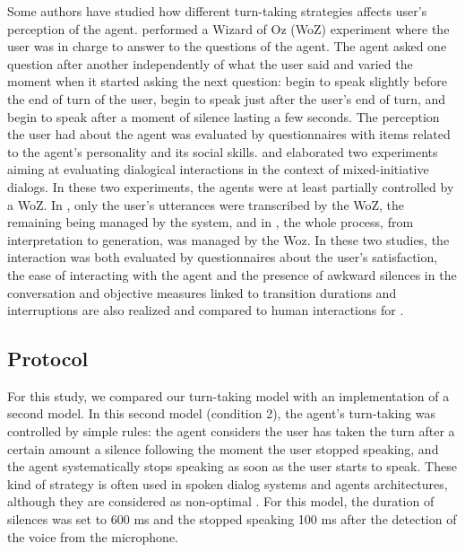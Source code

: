 Some authors have studied how different turn-taking strategies affects user's perception of the agent. 
\cite{ter_maat_how_2010} performed a Wizard of Oz (WoZ) experiment where the user was in charge to answer to the questions of the agent. The agent asked one question after another independently of what the user said and varied the moment when it started asking the next question: begin to speak slightly before the end of turn of the user, begin to speak just after the user's end of turn, and begin to speak after a moment of silence lasting a few seconds. The perception the user had about the agent was evaluated by questionnaires with items related to the agent's personality and its social skills. 
\cite{skantze_towards_2010} and \cite{de_vault_toward_2015} elaborated two experiments aiming at evaluating dialogical interactions in the context of mixed-initiative dialogs. In these two experiments, the agents were at least partially controlled by a WoZ. 
In \cite{skantze_towards_2010}, only the user's utterances were transcribed by the WoZ, the remaining being managed by the system, and in \cite{de_vault_toward_2015}, the whole process, from interpretation to generation, was managed by the Woz. In these two studies, the interaction was both evaluated by questionnaires about the user's satisfaction, the ease of interacting with the agent and the presence of awkward silences in the conversation and objective measures linked to transition durations and interruptions are also realized and compared to human interactions for \cite{de_vault_toward_2015}. 

\subsection{Protocol}

For this study, we compared our turn-taking model with an implementation of a second model. 
In this second model (condition 2), the agent's turn-taking was controlled by simple rules: the agent considers the user has taken the turn after a certain amount a silence following the moment the user stopped speaking, and the agent systematically stops speaking as soon as the user starts to speak. 
These kind of strategy is often used in spoken dialog systems and agents architectures, although they are considered as non-optimal \citep{ward_root_2005}. 
For this model, the duration of silences was set to 600 ms and the stopped speaking 100 ms after the detection of the voice from the microphone. 

